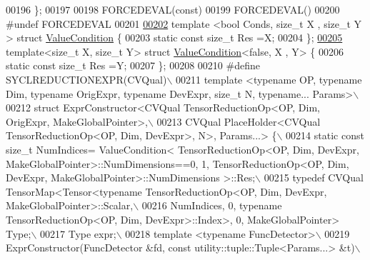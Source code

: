 \begin{DoxyCode}
00196 \textcolor{preprocessor}{\};}
00197 
00198 FORCEDEVAL(\textcolor{keyword}{const})
00199 FORCEDEVAL()
00200 \textcolor{preprocessor}{#undef FORCEDEVAL}
00201 
\hyperlink{struct_eigen_1_1_tensor_sycl_1_1internal_1_1_value_condition}{00202} \textcolor{keyword}{template} <\textcolor{keywordtype}{bool} Conds,  \textcolor{keywordtype}{size\_t} X , \textcolor{keywordtype}{size\_t} Y > \textcolor{keyword}{struct }\hyperlink{struct_eigen_1_1_tensor_sycl_1_1internal_1_1_value_condition}{ValueCondition} \{
00203   \textcolor{keyword}{static} \textcolor{keyword}{const} \textcolor{keywordtype}{size\_t} Res =X;
00204 \};
\hyperlink{struct_eigen_1_1_tensor_sycl_1_1internal_1_1_value_condition_3_01false_00_01_x_00_01_y_01_4}{00205} \textcolor{keyword}{template}<\textcolor{keywordtype}{size\_t} X, \textcolor{keywordtype}{size\_t} Y> \textcolor{keyword}{struct }\hyperlink{struct_eigen_1_1_tensor_sycl_1_1internal_1_1_value_condition}{ValueCondition}<false, X , Y> \{
00206   \textcolor{keyword}{static} \textcolor{keyword}{const} \textcolor{keywordtype}{size\_t} Res =Y;
00207 \};
00208 
00210 \textcolor{preprocessor}{#define SYCLREDUCTIONEXPR(CVQual)\(\backslash\)}
00211 \textcolor{preprocessor}{template <typename OP, typename Dim, typename OrigExpr, typename DevExpr, size\_t N, typename... Params>\(\backslash\)}
00212 \textcolor{preprocessor}{struct ExprConstructor<CVQual TensorReductionOp<OP, Dim, OrigExpr, MakeGlobalPointer>,\(\backslash\)}
00213 \textcolor{preprocessor}{CVQual PlaceHolder<CVQual TensorReductionOp<OP, Dim, DevExpr>, N>, Params...> \{\(\backslash\)}
00214 \textcolor{preprocessor}{  static const size\_t NumIndices= ValueCondition< TensorReductionOp<OP, Dim, DevExpr,
       MakeGlobalPointer>::NumDimensions==0,  1, TensorReductionOp<OP, Dim, DevExpr, MakeGlobalPointer>::NumDimensions >::Res;\(\backslash\)}
00215 \textcolor{preprocessor}{  typedef CVQual TensorMap<Tensor<typename TensorReductionOp<OP, Dim, DevExpr, MakeGlobalPointer>::Scalar,\(\backslash\)}
00216 \textcolor{preprocessor}{  NumIndices, 0, typename TensorReductionOp<OP, Dim, DevExpr>::Index>, 0, MakeGlobalPointer> Type;\(\backslash\)}
00217 \textcolor{preprocessor}{  Type expr;\(\backslash\)}
00218 \textcolor{preprocessor}{  template <typename FuncDetector>\(\backslash\)}
00219 \textcolor{preprocessor}{  ExprConstructor(FuncDetector &fd, const utility::tuple::Tuple<Params...> &t)\(\backslash\)}

\end{DoxyCode}
